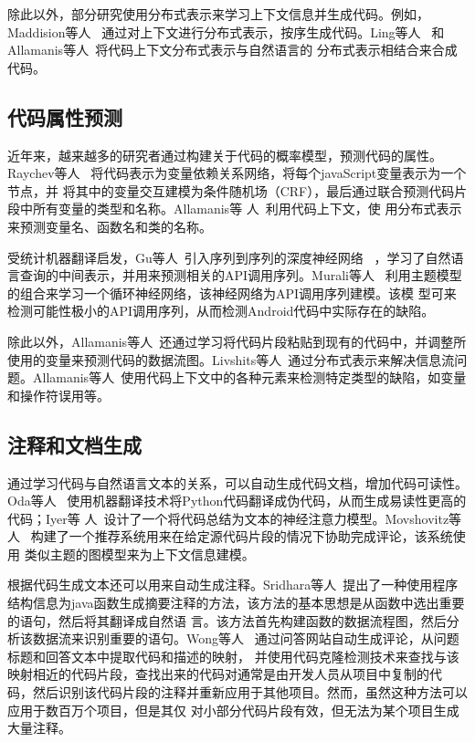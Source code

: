 除此以外，部分研究使用分布式表示来学习上下文信息并生成代码。例如，Maddision等人
~\cite{maddison2014structured}通过对上下文进行分布式表示，按序生成代码。Ling等人
~\cite{ling2016latent}和Allamanis等人~\cite{allamanis2015bimodal}将代码上下文分布式表示与自然语言的
分布式表示相结合来合成代码。



\subsection{代码属性预测}
近年来，越来越多的研究者通过构建关于代码的概率模型，预测代码的属性。Raychev等人
~\cite{raychev2015predicting}将代码表示为变量依赖关系网络，将每个javaScript变量表示为一个节点，并
将其中的变量交互建模为条件随机场（CRF），最后通过联合预测代码片段中所有变量的类型和名称。Allamanis等
人~\cite{allamanis2014learning,allamanis2015suggesting,allamanis2016convolutional}利用代码上下文，使
用分布式表示来预测变量名、函数名和类的名称。


受统计机器翻译启发，Gu等人~\cite{gu2016deep}引入序列到序列的深度神经网络
~\cite{sutskever2014sequence}，学习了自然语言查询的中间表示，并用来预测相关的API调用序列。Murali等人
~\cite{murali2017finding}利用主题模型的组合来学习一个循环神经网络，该神经网络为API调用序列建模。该模
型可来检测可能性极小的API调用序列，从而检测Android代码中实际存在的缺陷。

除此以外，Allamanis等人~\cite{allamanis2018learning}还通过学习将代码片段粘贴到现有的代码中，并调整所
使用的变量来预测代码的数据流图。Livshits等人~\cite{livshits2009merlin}通过分布式表示来解决信息流问
题。Allamanis等人~\cite{allamanis2018learning}使用代码上下文中的各种元素来检测特定类型的缺陷，如变量
和操作符误用等。


\subsection{注释和文档生成}
通过学习代码与自然语言文本的关系，可以自动生成代码文档，增加代码可读性。Oda等人
~\cite{oda2015learning}使用机器翻译技术将Python代码翻译成伪代码，从而生成易读性更高的代码；Iyer等
人~\cite{iyer2016summarizing}设计了一个将代码总结为文本的神经注意力模型。Movshovitz等人
~\cite{movshovitz2013natural}构建了一个推荐系统用来在给定源代码片段的情况下协助完成评论，该系统使用
类似主题的图模型来为上下文信息建模。

根据代码生成文本还可以用来自动生成注释。Sridhara等人~\cite{sridhara2010towards}提出了一种使用程序
结构信息为java函数生成摘要注释的方法，该方法的基本思想是从函数中选出重要的语句，然后将其翻译成自然语
言。该方法首先构建函数的数据流程图，然后分析该数据流来识别重要的语句。Wong等人
~\cite{wong2013autocomment}通过问答网站自动生成评论，从问题标题和回答文本中提取代码和描述的映射，
并使用代码克隆检测技术来查找与该映射相近的代码片段，查找出来的代码对通常是由开发人员从项目中复制的代
码，然后识别该代码片段的注释并重新应用于其他项目。然而，虽然这种方法可以应用于数百万个项目，但是其仅
对小部分代码片段有效，但无法为某个项目生成大量注释。

